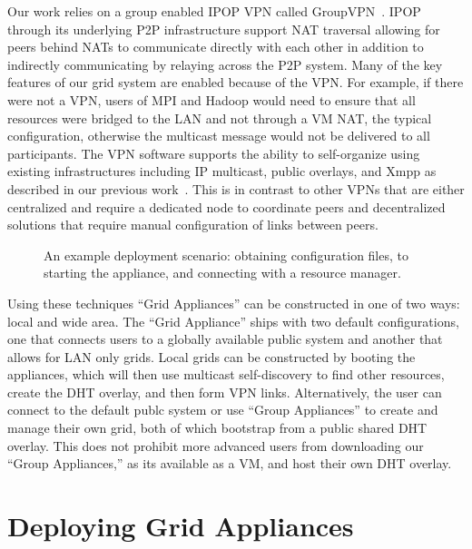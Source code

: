 \documentclass[conference]{IEEEtran}
\begin{document}
Our work relies on a group enabled IPOP VPN called GroupVPN~\cite{groupvpn}.
IPOP through its underlying P2P infrastructure support NAT traversal allowing
for peers behind NATs to communicate directly with each other in addition to
indirectly communicating by relaying across the P2P system.  Many of the key
features of our grid system are enabled because of the VPN.  For example, if
there were not a VPN, users of MPI and Hadoop would need to ensure that all
resources were bridged to the LAN and not through a VM NAT, the typical
configuration, otherwise the multicast message would not be delivered to all
participants.  The VPN software supports the ability to self-organize using
existing infrastructures including IP multicast, public overlays, and Xmpp as
described in our previous work~\cite{p2p10}.  This is in contrast to other VPNs
that are either centralized and require a dedicated node to coordinate peers
and decentralized solutions that require manual configuration of links between
peers.

\begin{figure*}[ht]
\centering
{}
\caption{An example deployment scenario:  obtaining configuration files, to
starting the appliance, and connecting with a resource manager.}
\label{fig:system}
\end{figure*}

Using these techniques ``Grid Appliances'' can be constructed in one of two
ways: local and wide area.  The ``Grid Appliance'' ships with two default
configurations, one that connects users to a globally available public system
and another that allows for LAN only grids.  Local grids can be constructed by
booting the appliances, which will then use multicast self-discovery to find
other resources, create the DHT overlay, and then form VPN links.
Alternatively, the user can connect to the default publc system or use ``Group
Appliances'' to create and manage their own grid, both of which bootstrap from
a public shared DHT overlay.  This does not prohibit more advanced users from
downloading our ``Group Appliances,'' as its available as a VM, and host their
own DHT overlay.

\section{Deploying Grid Appliances}
\label{system}
\end{document}
